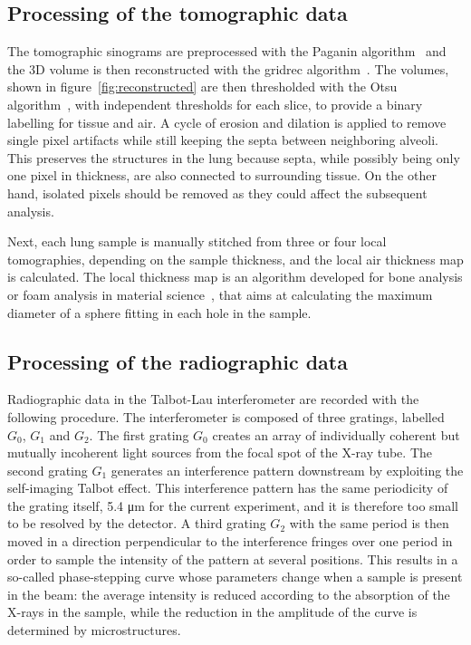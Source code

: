 
\subsection{Processing of the tomographic data}\label{sec:tomoprocessing}
The tomographic sinograms are preprocessed with the Paganin
algorithm~\cite{Paganin_2002a} and
the 3D volume is then reconstructed with the gridrec
algorithm~\cite{Marone_2012}. The volumes, shown in
figure~\ref{fig:reconstructed} are then thresholded with the Otsu
algorithm~\cite{Otsu_1979}, with independent thresholds for each slice, to
provide a binary labelling for tissue and air. A cycle of
erosion and dilation is applied to remove single pixel artifacts while still
keeping the septa between neighboring alveoli.
This preserves the structures in the lung because septa, while possibly
being only one pixel in thickness, are also connected to surrounding tissue.
On the other hand, isolated pixels should be removed as they could affect
the subsequent analysis.



Next, each lung sample is manually stitched from three or four local
tomographies, depending on the sample thickness, and the local air thickness
map is calculated. The local thickness map is an algorithm developed for
bone analysis or foam analysis in material science~\cite{Hildebrand_2003}, that aims
at calculating the maximum diameter of a sphere fitting in each hole in the
sample.

\subsection{Processing of the radiographic data}\label{sec:radioprocessing}
Radiographic data in the Talbot-Lau interferometer are recorded with the
following procedure. The interferometer is composed of three gratings,
labelled $G_0$, $G_1$ and $G_2$. The first grating $G_0$ creates an array of
individually coherent but mutually incoherent light sources from the
focal spot of the X-ray tube. The second grating $G_1$ generates an
interference pattern downstream by exploiting the self-imaging Talbot
effect. This interference pattern has the same periodicity of the grating
itself, 5.4 μm for the current experiment, and it is therefore too small to
be resolved by the detector. A third grating $G_2$ with the same period is
then moved in a direction perpendicular to the interference fringes over one
period in order to sample the intensity of the pattern at several positions.
This results in a so-called phase-stepping curve whose parameters change
when a sample is present in the beam: the average intensity is reduced
according to the absorption of the X-rays in the sample, while the reduction
in the amplitude of the curve is determined by microstructures.

